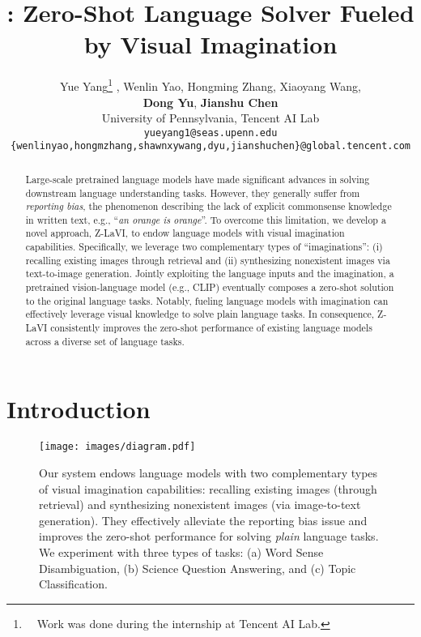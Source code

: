 \documentclass[11pt]{article}
\title{\model: Zero-Shot Language Solver Fueled by Visual Imagination}
\author{Yue Yang\thanks{~~Work was done during the internship at Tencent AI Lab.} , Wenlin Yao, Hongming Zhang, Xiaoyang Wang, \\\textbf{Dong Yu}, \textbf{Jianshu Chen} \\
University of Pennsylvania, Tencent AI Lab\\
{\small \tt {yueyang1@seas.upenn.edu}}\\
{\small {\tt \{wenlinyao,hongmzhang,shawnxywang,dyu,jianshuchen\}@global.tencent.com}}}
\begin{document}
\maketitle
\begin{abstract}
Large-scale pretrained language models have made significant advances in solving downstream language understanding tasks. However, they generally suffer from \emph{reporting bias}, the phenomenon describing the lack of explicit commonsense knowledge in written text, e.g., ``\textit{an orange is orange}''.
To overcome this limitation, we develop a novel approach, Z-LaVI, to endow language models with visual imagination capabilities. Specifically, we leverage two complementary types of ``imaginations'': (i) recalling existing images through retrieval and (ii) synthesizing nonexistent images via text-to-image generation. Jointly exploiting the language inputs and the imagination, a pretrained vision-language model (e.g., CLIP) eventually composes a zero-shot solution to the original language tasks. Notably, fueling language models with imagination can effectively leverage visual knowledge to solve plain language tasks. In consequence, Z-LaVI consistently improves the zero-shot performance of existing language models across a diverse set of language tasks.\protect\footnotemark





\end{abstract}

\section{Introduction}

\begin{figure}[!t]
\centering
    \texttt{[image: images/diagram.pdf]}
    \caption{Our system endows language models with two complementary types of visual imagination capabilities: recalling existing images (through retrieval) and synthesizing nonexistent images (via image-to-text generation). They effectively alleviate the reporting bias issue and improves the zero-shot performance for solving \emph{plain} language tasks. We experiment with three types of tasks: (a) Word Sense Disambiguation, (b) Science Question Answering, and (c) Topic Classification.}
    \label{fig:tasks_convertion}
\end{figure}
\end{document}
